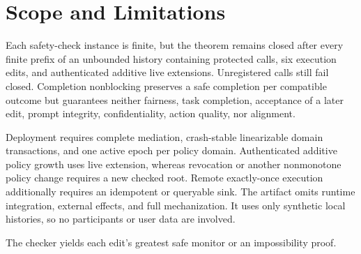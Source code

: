 \section{Scope and Limitations}
\label{sec:discussion}

Each safety-check instance is finite, but the theorem remains closed after every finite prefix of an unbounded history containing protected calls, six execution edits, and authenticated additive live extensions.
Unregistered calls still fail closed.
Completion nonblocking preserves a safe completion per compatible outcome but guarantees neither fairness, task completion, acceptance of a later edit, prompt integrity, confidentiality, action quality, nor alignment.

Deployment requires complete mediation, crash-stable linearizable domain transactions, and one active epoch per policy domain.
Authenticated additive policy growth uses live extension, whereas revocation or another nonmonotone policy change requires a new checked root.
Remote exactly-once execution additionally requires an idempotent or queryable sink.
The artifact omits runtime integration, external effects, and full mechanization.
It uses only synthetic local histories, so no participants or user data are involved.

The checker yields each edit's greatest safe monitor or an impossibility proof.
